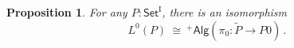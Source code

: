 \documentclass[11pt]{article}
\newcommand{\Set}{\ensuremath{\mathsf{Set}}}
\newcommand{\plusalg}[1]{\ensuremath{^+\!\mathsf{Alg}{(#1)}}}
\newcommand{\plusalgx}{\ensuremath{^+\!\mathsf{Alg}}}
\newcommand{\mono}{\ensuremath{\rightarrowtail}}
\newcommand{\I}{\ensuremath{\mathrm{I}}}
\newtheorem{proposition}[theorem]{Proposition}
\theoremstyle{remark}
\theoremstyle{definition}
\begin{document}
\begin{proposition}
For any $ P : \Set^\I$, there is an isomorphism
\[
L^0(P)\ \cong\ \plusalg{\pi_0 : \widetilde{P} \to P0}\,.
\]
\end{proposition}
%
\end{document}
